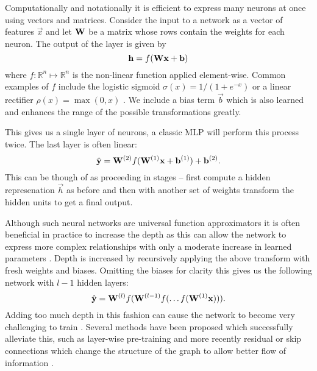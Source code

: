 Computationally and
notationally it is efficient to express many neurons at once using vectors and matrices.
Consider the input to a network as a vector of features \(\vec{x}\)
and let \(\mathbf{W}\) be a matrix
whose rows contain the weights for each neuron. The output of the layer is given by
\begin{equation} \label{eq:matperceptron}
	\mathbf{h} = f(\mathbf{W}\mathbf{x} + \mathbf{b})
\end{equation} where \(f: \mathbb{R}^n \mapsto \mathbb{R}^n\) is the non-linear function applied
element-wise. Common examples of \(f\)
include the logistic sigmoid \(\sigma(x) = 1/(1 + e^{-x})\) or
a linear rectifier \(\rho(x) = \max(0, x)\) \autocite{Nair}. We include a bias term \(\vec{b}\)
which is also learned and enhances the range of the possible transformations greatly.

This gives us a single layer of neurons, a classic MLP will perform this process twice. 
The last layer
is often linear:
\begin{equation}
	\hat{\mathbf{y}} = \mathbf{W}^{(2)}f(\mathbf{W}^{(1)}\mathbf{x} + \mathbf{b}^{(1)}) + \mathbf{b}^{(2)}.
\end{equation} This can be though of as proceeding in stages -- first compute a hidden represenation
\(\vec{h}\) as before
and then with another set of weights transform the hidden units to get a final output.

Although such neural networks are universal function approximators \autocite{Hornik1989} it is often
beneficial in practice to increase the depth as this can allow the network to express more complex
relationships
with only a moderate increase in learned parameters  \autocite{Telgarsky2016}. Depth is increased
by recursively applying the above transform with fresh weights and biases. Omitting the
biases for clarity this gives us the following network with \(l-1\) hidden layers:
\begin{equation}
	\hat{\mathbf{y}} = \mathbf{W}^{(l)}f(\mathbf{W}^{(l-1)}f(\dots f(\mathbf{W}^{(1)}\mathbf{x}))).
\end{equation} Adding too much depth in this fashion can cause the network to become very challenging
to train \autocite{Glorot2010, Saxe2013}. Several methods have been proposed which successfully
alleviate this, such as layer-wise pre-training \autocite{Hinton2006,Vincent2010} and more
recently residual or skip connections which change the structure of the graph to allow better flow of 
information \autocite{He2015, Huang2016}.

